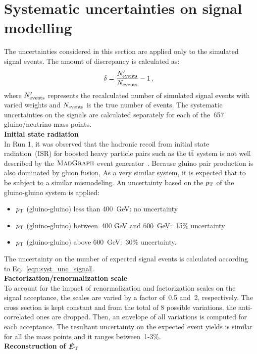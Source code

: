 \section{Systematic uncertainties on signal modelling}
The uncertainties considered in this section are applied only to the simulated signal events. The amount of discrepancy is calculated as:
\begin{equation}
\label{eqn:syst_unc_signal}
\delta = \frac{N'_{\rm events}}{N_{\rm events}}-1\, ,
\end{equation}
where $N'_{\rm events}$ represents the recalculated number of simulated signal events with varied weights and $N_{\rm events}$ is the true number of events. The systematic uncertainties on the signals are calculated separately for each of the~657 gluino/neutrino mass points.\\
\textbf{Initial state radiation}\\
In Run 1, it was observed that the hadronic recoil from initial state radiation~(ISR) for boosted heavy particle pairs such as the $\rm t\bar{t}$ system is not well described by the $\textsc{MadGraph}$ event generator~\cite{ISR}. Because gluino pair production is also dominated by gluon fusion,
As a very similar system, it is expected that to be subject to a similar mismodeling.
An uncertainty based on the $p_{\rm T}$ of the gluino-gluino system is applied:
\begin{itemize}
\item $p_{\rm T}$ (gluino-gluino) less than 400~GeV: no uncertainty
\item $p_{\rm T}$ (gluino-gluino) between~400 GeV and 600~GeV:~15\% uncertainty
\item $p_{\rm T}$ (gluino-gluino) above 600~GeV:~30\% uncertainty.
\end{itemize}
The uncertainty on the number of expected signal events is calculated according to Eq.~\ref{eqn:syst_unc_signal}.\\
\textbf{Factorization/renormalization scale}\\
To account for the impact of renormalization and factorization scales on the signal acceptance, the scales are varied by a factor of~0.5 and~2, respectively. The cross section is kept constant and from the total of 8 possible variations, the anti-correlated ones are dropped. Then, an envelope of all variations is computed for each acceptance. The resultant uncertainty on the expected event yields is similar for all the mass points and it ranges between~1-3\%.\\
\textbf{Reconstruction of $\slashed{E}_{\rm T}$} \\
